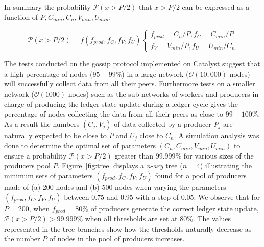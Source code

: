 In summary the probability $\mathcal{P}(x>P/2)$ that $x >P/2$ can be expressed as a function of $P, C_{min} ,C_n, V_{min}, U_{min}$:
\begin{center}
\[
  \mathcal{P}(x>P/2) = f(f_{prod}, f_C, f_V, f_U)\begin{cases}
               f_{prod} = C_n/P, f_C = C_{min}/P\\
               f_V = V_{min}/P, f_{U} = U_{min}/C_n
            \end{cases}
\]
\end{center}
The tests conducted on the gossip protocol implemented on Catalyst suggest that a high percentage of nodes ($95-99\%$) in a large network ($\mathcal{O}(10,000)$ nodes) will successfully collect data from all their peers. Furthermore tests on a smaller network ($\mathcal{O}(1000)$ nodes) such as the sub-networks of workers and producers in charge of producing the ledger state update during a ledger cycle gives the percentage of nodes collecting the data from all their peers as close to $99-100\%$. As a result the numbers $(C_{j} ,V_{j})$ of data collected by a producer $P_j$ are naturally expected to be close to $P$ and $U_j$ close to $C_n$. A simulation analysis was done to determine the optimal set of parameters $(C_n, C_{min}, V_{min}, U_{min})$ to ensure a probability $\mathcal{P}(x>P/2)$ greater than 99.999\% for various sizes of the producers pool $P$.
Figure~\ref{fig:tree} displays a \textit{n-ary} tree ($n=4$) illustrating the minimum sets of parameters $(f_{prod}, f_C, f_V, f_U)$ found for a pool of producers made of (a) 200 nodes and (b) 500 nodes when varying the parameters $(f_{prod}, f_C, f_V, f_U)$ between 0.75 and 0.95 with a step of 0.05. We observe that for $P = 200$, when $f_{prod}=80\%$ of producers generate the correct ledger state update, $\mathcal{P}(x>P/2) > 99.999\%$ when all thresholds are set at 80\%. The values represented in the tree branches show how the thresholds naturally decrease as the number $P$ of nodes in the pool of producers increases.


